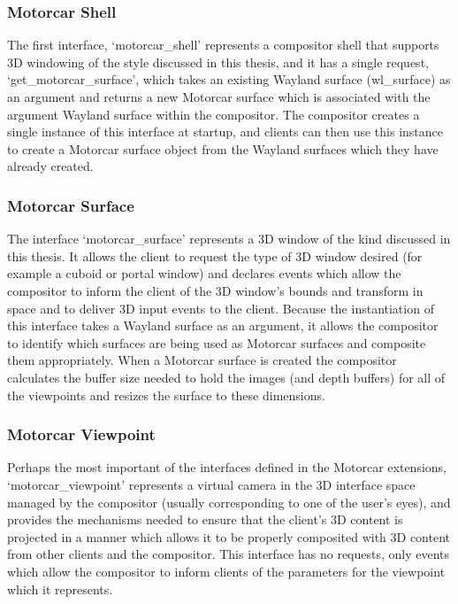 \subsubsection{Motorcar Shell}

The first interface, `motorcar{\_}shell' represents a compositor shell that supports 3D windowing of the style discussed in this thesis, and  it has a single request, `get{\_}motorcar{\_}surface', which takes an existing Wayland surface (wl{\_}surface) as an argument and returns a new Motorcar surface which is associated with the argument Wayland surface within the compositor.  The compositor creates a single instance of this interface at startup, and clients can then use this instance to create a Motorcar surface object from the Wayland surfaces which they have already created.

\subsubsection{Motorcar Surface}

The interface `motorcar{\_}surface' represents a 3D window of the kind discussed in this thesis. It allows the client to request the type of 3D window desired (for example a cuboid or portal window) and declares events which allow the compositor to inform the client of the 3D window's bounds and transform in space and to deliver 3D input events to the client. Because the instantiation of this interface takes a Wayland surface as an argument, it allows the compositor to identify which surfaces are being used as Motorcar surfaces and composite them appropriately. When a Motorcar surface is created the compositor calculates the buffer size needed to hold the images (and depth buffers) for all of the viewpoints and resizes the surface to these dimensions.

\subsubsection{Motorcar Viewpoint}

Perhaps the most important of the interfaces defined in the Motorcar extensions, `motorcar{\_}viewpoint' represents a virtual camera in the 3D interface space managed by the compositor (usually corresponding to one of the user's eyes), and provides the mechanisms needed to ensure that the client's 3D content is projected in a manner which allows it to be properly composited with 3D content from other clients and the compositor. This interface has no requests, only events which allow the compositor to inform clients of the parameters for the viewpoint which it represents.

